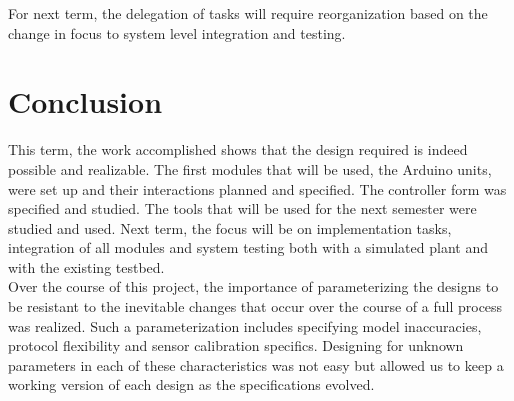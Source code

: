 \documentclass{article}
\begin{document}
\noindent For next term, the delegation of tasks will require reorganization based on the change in focus to system level integration and testing. 

\section{Conclusion}
This term, the work accomplished shows that the design required is indeed possible and realizable. The first modules that will be used, the Arduino units, were set up and their interactions planned and specified. The controller form was specified and studied. The tools that will be used for the next semester were studied and used. Next term, the focus will be on implementation tasks, integration of all modules and system testing both with a simulated plant and with the existing testbed. \\

\noindent Over the course of this project, the importance of parameterizing the designs to be resistant to the inevitable changes that occur over the course of a full process was realized. Such a parameterization includes specifying model inaccuracies, protocol flexibility and sensor calibration specifics. Designing for unknown parameters in each of these characteristics was not easy but allowed us to keep a working version of each design as the specifications evolved. 
\end{document}
